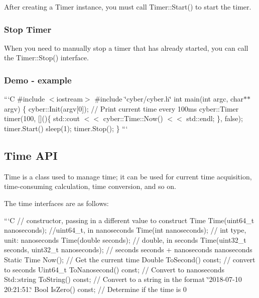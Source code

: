 {\ttfamily }

{\ttfamily After creating a Timer instance, you must call {\ttfamily Timer\-::\-Start()} to start the timer.}

{\ttfamily \subsubsection*{Stop Timer}}

{\ttfamily }

{\ttfamily When you need to manually stop a timer that has already started, you can call the {\ttfamily Timer\-::\-Stop()} interface.}

{\ttfamily \subsubsection*{Demo -\/ example}}

{\ttfamily }

{\ttfamily ```\-C \#include $<$iostream$>$ \#include \char`\"{}cyber/cyber.\-h\char`\"{} int main(int argc, char$\ast$$\ast$ argv) \{ cyber\-::\-Init(argv\mbox{[}0\mbox{]}); // Print current time every 100ms cyber\-::\-Timer timer(100, \mbox{[}\mbox{]}()\{ std\-::cout $<$$<$ cyber\-::\-Time\-::\-Now() $<$$<$ std\-::endl; \}, false); timer.\-Start() sleep(1); timer.\-Stop(); \} ```}

{\ttfamily \subsection*{Time A\-P\-I}}

{\ttfamily }

{\ttfamily Time is a class used to manage time; it can be used for current time acquisition, time-\/consuming calculation, time conversion, and so on.}

{\ttfamily The time interfaces are as follows\-:}

{\ttfamily ```\-C // constructor, passing in a different value to construct Time Time(uint64\-\_\-t nanoseconds); //uint64\-\_\-t, in nanoseconds Time(int nanoseconds); // int type, unit\-: nanoseconds Time(double seconds); // double, in seconds Time(uint32\-\_\-t seconds, uint32\-\_\-t nanoseconds); // seconds seconds + nanoseconds nanoseconds Static Time Now(); // Get the current time Double To\-Second() const; // convert to seconds Uint64\-\_\-t To\-Nanosecond() const; // Convert to nanoseconds Std\-::string To\-String() const; // Convert to a string in the format \char`\"{}2018-\/07-\/10 20\-:21\-:51.\char`\"{} Bool Is\-Zero() const; // Determine if the time is 0}

